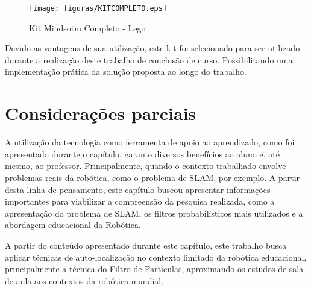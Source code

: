 \begin{figure}[H]
	\centering
	\texttt{[image: figuras/KITCOMPLETO.eps]}
	\caption[Kit Mindsotm Completo - Lego]{Kit Mindsotm Completo - Lego}
	\label{img:kit}
\end{figure}

Devido as vantagens de sua utilização, este kit foi selecionado para ser utilizado durante a realização deste trabalho de conclusão de curso. Possibilitando uma implementação prática da solução proposta ao longo do trabalho.


\section{Considerações parciais} %
\label{sec:considerações_parciais}

	A utilização da tecnologia como ferramenta de apoio ao aprendizado, como foi apresentado durante o capítulo, garante diversos benefícios ao aluno e, até mesmo, ao professor. Principalmente, quando o contexto trabalhado envolve problemas reais da robótica, como o problema de SLAM, por exemplo. A partir desta linha de pensamento, este capítulo buscou apresentar informações importantes para viabilizar a compreensão da pesquisa realizada, como a apresentação do problema de SLAM, os filtros probabilísticos mais utilizados e a abordagem educacional da Robótica.

	A partir do conteúdo apresentado durante este capítulo, este trabalho busca aplicar técnicas de auto-localização no contexto limitado da robótica educacional, principalmente a técnica do Filtro de Partículas, aproximando os estudos de sala de aula aos contextos da robótica mundial.

